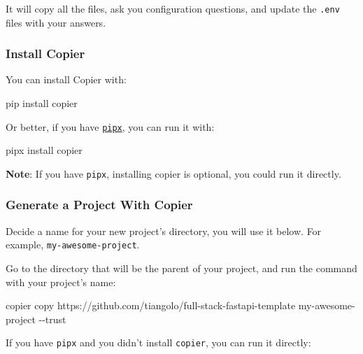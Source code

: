 \documentclass[
]{article}
\newenvironment{Shaded}{}{}
\newcommand{\AttributeTok}[1]{\textcolor[rgb]{0.49,0.56,0.16}{#1}}
\newcommand{\ExtensionTok}[1]{#1}
\newcommand{\NormalTok}[1]{#1}
\begin{document}
It will copy all the files, ask you configuration questions, and update
the \texttt{.env} files with your answers.

\hypertarget{install-copier}{%
\subsubsection{Install Copier}\label{install-copier}}

You can install Copier with:

\begin{Shaded}
\begin{Highlighting}[]
\ExtensionTok{pip}\NormalTok{ install copier}
\end{Highlighting}
\end{Shaded}

Or better, if you have \href{https://pipx.pypa.io/}{\texttt{pipx}}, you
can run it with:

\begin{Shaded}
\begin{Highlighting}[]
\ExtensionTok{pipx}\NormalTok{ install copier}
\end{Highlighting}
\end{Shaded}

\textbf{Note}: If you have \texttt{pipx}, installing copier is optional,
you could run it directly.

\hypertarget{generate-a-project-with-copier}{%
\subsubsection{Generate a Project With
Copier}\label{generate-a-project-with-copier}}

Decide a name for your new project's directory, you will use it below.
For example, \texttt{my-awesome-project}.

Go to the directory that will be the parent of your project, and run the
command with your project's name:

\begin{Shaded}
\begin{Highlighting}[]
\ExtensionTok{copier}\NormalTok{ copy https://github.com/tiangolo/full{-}stack{-}fastapi{-}template my{-}awesome{-}project }\AttributeTok{{-}{-}trust}
\end{Highlighting}
\end{Shaded}

If you have \texttt{pipx} and you didn't install \texttt{copier}, you
can run it directly:
\end{document}
